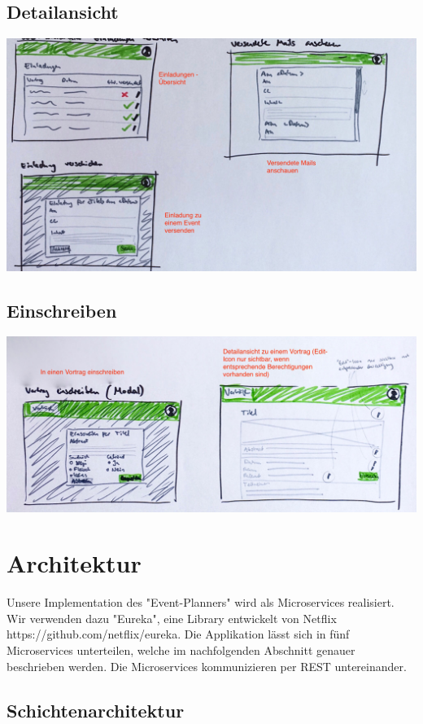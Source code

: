 \documentclass[11pt]{article} %
\begin{document}
\subsection{Detailansicht}
\includegraphics[width=1\textwidth]{prototyp/Einladungen}

\subsection{Einschreiben}
\includegraphics[width=1\textwidth]{prototyp/Vortrag}

\newpage
\section{Architektur}
Unsere Implementation des "Event-Planners" wird als Microservices realisiert. Wir verwenden dazu "Eureka", eine Library entwickelt von Netflix https://github.com/netflix/eureka.  Die Applikation lässt sich in fünf Microservices unterteilen, welche im nachfolgenden Abschnitt genauer beschrieben werden. Die Microservices kommunizieren per REST untereinander.

\subsection{Schichtenarchitektur}
\end{document}
